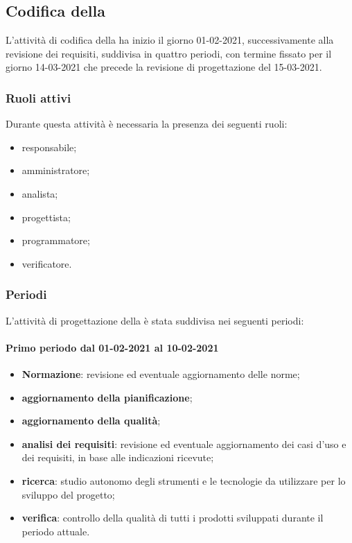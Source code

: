 \newpage
\subsection{Codifica della }
L'attività di codifica della  ha inizio il giorno 01-02-2021, successivamente alla revisione dei requisiti, suddivisa in quattro periodi, con termine fissato per il giorno 14-03-2021 che precede la revisione di progettazione del 15-03-2021.

\subsubsection{Ruoli attivi}
Durante questa attività è necessaria la presenza dei seguenti ruoli:
\begin{itemize}
	\item responsabile;
	\item amministratore;
	\item analista;
	\item progettista;
	\item programmatore;
	\item verificatore.
\end{itemize}

\subsubsection{Periodi}
L'attività di progettazione della  è stata suddivisa nei seguenti periodi:

\paragraph{Primo periodo dal 01-02-2021 al 10-02-2021}
\begin{itemize}
	\item \textbf{Normazione}: revisione ed eventuale aggiornamento delle norme;
	\item \textbf{aggiornamento della pianificazione};
	\item \textbf{aggiornamento della qualità};
	\item \textbf{analisi dei requisiti}: revisione ed eventuale aggiornamento dei casi d’uso e dei requisiti, in base alle indicazioni ricevute;
	\item \textbf{ricerca}: studio autonomo degli strumenti e le tecnologie da utilizzare per lo sviluppo del
	progetto;
	\item \textbf{verifica}: controllo della qualità di tutti i prodotti sviluppati durante il periodo attuale.
\end{itemize}

